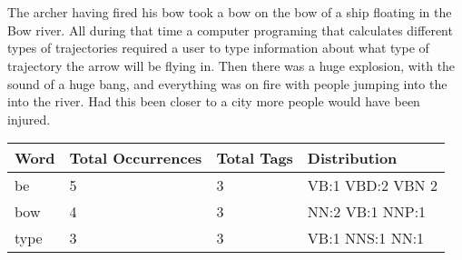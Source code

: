 \documentclass[12pt]{article}
\begin{document}
\section{}
The archer having fired his bow took a bow on the bow of a ship floating in the Bow river.
 All during that time a computer programing that calculates 
 different types of trajectories required a user to type
  information about what type of trajectory the arrow will
   be flying in. Then there was a huge explosion, with the
 sound of a huge bang, and everything was on fire with people jumping into the into the river.  Had this been closer to a city more people would have been injured.




\begin{tabular}{ | l | l | l | l | }
	\hline
	Word & Total Occurrences & Total Tags & Distribution\\\hline
	be & 5 & 3 & VB:1 VBD:2 VBN 2 \\\hline
	bow & 4 & 3 & NN:2 VB:1 NNP:1\\\hline
	type & 3 & 3 & VB:1  NNS:1 NN:1\\\hline
	\end{tabular}

\cite{Cat_Tag_Words}


\end{document}
